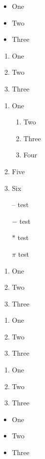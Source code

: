 \documentclass{article}
\begin{document}
	
	\begin{itemize}
		\item One
		\item Two
		\item Three
	\end{itemize}
	
	\begin{enumerate}
		\item One
		\item Two
		\item Three
	\end{enumerate}
	
	\begin{enumerate}
		\item One
		\begin{enumerate}
			\item Two
		    \item Three
		    \item Four
		\end{enumerate}
		\item Five
		\item Six
		\item[--] test
		\item[$-$] test
		\item[$\ast$] test
		\item[$\pi$] test
	\end{enumerate}
	
	\begin{enumerate}[label=(\roman*)]
		\item One
		\item Two
		\item Three
	\end{enumerate}

	\begin{enumerate}[label=\arabic*)]
		\item One
		\item Two
		\item Three
	\end{enumerate}

	\begin{enumerate}[label=\alph*)]
		\item One
		\item Two
		\item Three
	\end{enumerate}
	
	\begin{itemize}[label=$\ast$]
		\item One
		\item Two
		\item Three
	\end{itemize}
	
\end{document}
